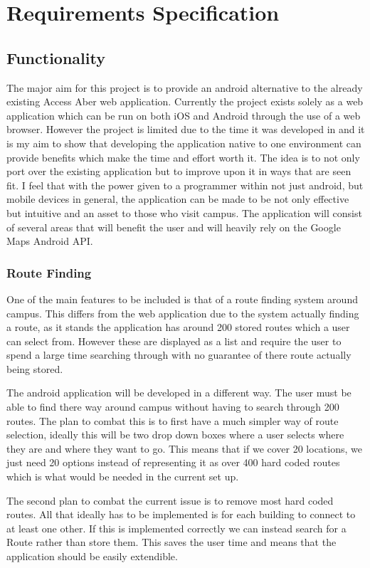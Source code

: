 \chapter{Requirements Specification}


\section{Functionality}

The major aim for this project is to provide an android alternative to the already existing Access Aber web application. Currently the project exists solely as a web application which can be run on both iOS and Android through the use of a web browser. However the project is limited due to the time it was developed in and it is my aim to show that developing the application native to one environment can provide benefits which make the time and effort worth it. The idea is to not only port over the existing application but to improve upon it in ways that are seen fit. I feel that with the power given to a programmer within not just android, but mobile devices in general, the application can be made to be not only effective but intuitive and an asset to those who visit campus. The application will consist of several areas that will benefit the user and will heavily rely on the Google Maps Android API. 
\subsection{Route Finding}
One of the main features to be included is that of a route finding system around campus. This differs from the web application due to the system actually finding a route, as it stands the application has around 200 stored routes which a user can select from. However these are displayed as a list and require the user to spend a large time searching through with no guarantee of there route actually being stored.

The android application will be developed in a different way. The user must be able to find there way around campus without having to search through 200 routes. The plan to combat this is to first have a much simpler way of route selection, ideally this will be two drop down boxes where a user selects where they are and where they want to go. This means that if we cover 20 locations, we just need 20 options instead of representing it as over 400 hard coded routes which is what would be needed in the current set up. 

The second plan to combat the current issue is to remove most hard coded routes. All that ideally has to be implemented is for each building to connect to at least one other. If this is implemented correctly we can instead search for a Route rather than store them. This saves the user time and means that the application should be easily extendible. 

